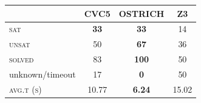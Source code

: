   \begin{tabular}{lccc}
    \toprule
    \textbf{}          & CVC5        & OSTRICH       & Z3    \\
    \midrule
    \textsc{sat}       & \textbf{33} & \textbf{33}   & 14    \\
    \midrule
    \textsc{unsat}     & 50          & \textbf{67}   & 36    \\
    \midrule
    \textsc{solved}    & 83          & \textbf{100}  & 50    \\
    unknown/timeout    & 17          & \textbf{0}    & 50    \\
    \midrule
    \textsc{avg.t (s)} & 10.77       & \textbf{6.24} & 15.02 \\
    \bottomrule
  \end{tabular} %
